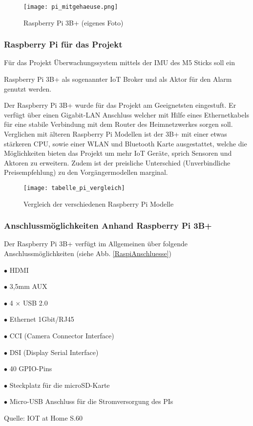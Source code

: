 \documentclass[a4paper,12pt]{article}
\begin{document}
	\begin{figure}[H]
	\centering
	\texttt{[image: pi\_mitgehaeuse.png]}
	\caption{Raspberry Pi 3B+ (eigenes Foto)}
	\label{pi_mitgehaeuse}
\end{figure}	


\subsubsection{Raspberry Pi für das Projekt}
Für das Projekt Überwachungssystem mittels der IMU des M5 Sticks soll ein\par 
Raspberry Pi 3B+ als sogenannter IoT Broker und als Aktor für den Alarm genutzt werden.\par
Der Raspberry Pi 3B+ wurde für das Projekt am Geeignetsten eingestuft. Er verfügt über einen Gigabit-LAN Anschluss welcher mit Hilfe eines Ethernetkabels für eine stabile Verbindung mit dem Router des Heimnetzwerkes sorgen soll. Verglichen mit älteren Raspberry Pi Modellen ist der 3B+ mit einer etwas stärkeren CPU, sowie einer WLAN und Bluetooth Karte ausgestattet, welche die Möglichkeiten bieten das Projekt um mehr IoT Geräte, sprich Sensoren und Aktoren zu erweitern. Zudem ist der preisliche Unterschied (Unverbindliche Preisempfehlung) zu den Vorgängermodellen marginal.  

	\begin{figure}[H]
	\centering
	\texttt{[image: tabelle\_pi\_vergleich]}
	\caption{Vergleich der verschiedenen Raspberry Pi Modelle \protect\cite[S. 59]{Huwe.2019}}
	\label{tabelle_pi_vergleich}
\end{figure}


\subsubsection{Anschlussmöglichkeiten Anhand Raspberry Pi 3B+}
Der Raspberry Pi 3B+ verfügt im Allgemeinen über folgende Anschlussmöglichkeiten (siehe Abb. \ref{RaspiAnschluesse})\par 
$\bullet$ HDMI   \par %
$\bullet$ 3,5mm AUX\par 
$\bullet$ 4 $\times$ USB 2.0 \par 
$\bullet$ Ethernet 1Gbit/RJ45\par 
$\bullet$ CCI (Camera Connector Interface)\par 
$\bullet$  DSI (Display Serial Interface)\par
$\bullet$ 40 GPIO-Pins\par
$\bullet$ Steckplatz für die microSD-Karte\par
$\bullet$ Micro-USB Anschluss für die Stromversorgung des PIs\par
Quelle: IOT at Home S.60\par
\end{document}
